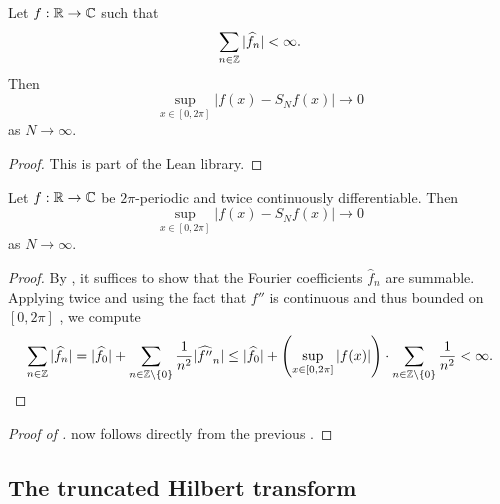 \begin{lemma}
\label{convergence-of-coeffs-summable}
\leanok
{}
Let $f:{\mathbb{R}} \to \mathbb{C}$ such that
\begin{equation}
    \sum_{n\in {\mathbb{Z}}} |\widehat{f}_n| < \infty.
\end{equation}
Then
\begin{equation}
    \sup_{x\in [0,2\pi]} |f(x) - S_Nf(x)| \rightarrow 0
\end{equation}
as $N \rightarrow \infty$.
\end{lemma}

\begin{proof}
\leanok
    This is part of the Lean library.
\end{proof}

\begin{lemma}
\label{convergence-for-twice-contdiff}
\leanok
{}
    Let $f:{\mathbb{R}} \to \mathbb{C}$ be $2\pi$-periodic and twice continuously differentiable. Then
    \begin{equation}
        \sup_{x\in [0,2\pi]} |f(x) - S_Nf(x)| \rightarrow 0
    \end{equation}
    as $N \rightarrow \infty$.
\end{lemma}
\begin{proof}
\leanok
By , it suffices to show that the Fourier coefficients $\widehat{f}_n$ are summable.
Applying  twice and using the fact that $f''$ is continuous and thus bounded on $[0,2\pi]$ , we compute
\begin{equation*}
    \sum_{n\in {\mathbb{Z}}} |\widehat{f}_n| = |\widehat{f}_0| + \sum_{n\in {\mathbb{Z}} \setminus \{0\}} \frac {1}{n^2} |\widehat{f''}_n|
    \le |\widehat{f}_0| + \left(\sup_{x\in [0,2\pi]} |f(x)| \right) \cdot \sum_{n\in {\mathbb{Z}} \setminus \{0\}} \frac {1}{n^2}
    < \infty.
\end{equation*}
\end{proof}

\begin{proof}[Proof of ]
\leanok
{}
     now follows directly from the previous .
\end{proof}


\subsection{The truncated Hilbert transform}
\label{10hilbert}





